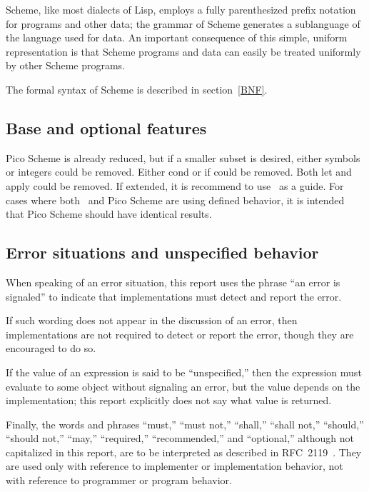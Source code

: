 Scheme, like most dialects of Lisp, employs a fully parenthesized prefix
notation for programs and other data; the grammar of Scheme generates a
sublanguage of the language used for data.  An important
consequence of this simple, uniform representation is that
Scheme programs and data can easily be treated uniformly by other Scheme programs.

The formal syntax of Scheme is described in section~\ref{BNF}.

\subsection{Base and optional features}
\label{qualifiers}

Pico Scheme is already reduced, but if a smaller subset is desired,
either symbols or integers could be removed. Either {\cf cond} or {\cf
  if} could be removed. Both {\cf let} and {\cf apply} could be
removed. If extended, it is recommend to use \rsevenrs\ as a
guide. For cases where both \rsevenrs\ and Pico Scheme are using
defined behavior, it is intended that Pico Scheme should have
identical results.


\subsection{Error situations and unspecified behavior}
\label{errorsituations}

When speaking of an error situation, this report uses the phrase ``an
error is signaled'' to indicate that implementations must detect and
report the error.

\vest If such wording does not appear in the discussion of
an error, then implementations are not required to detect or report the
error, though they are encouraged to do so.

\vest If the value of an expression is said to be ``unspecified,'' then
the expression must evaluate to some object without signaling an error,
but the value depends on the implementation; this report explicitly does
not say what value is returned. 

\vest Finally, the words and phrases ``must,'' ``must not,'' ``shall,''
``shall not,'' ``should,'' ``should not,'' ``may,'' ``required,''
``recommended,'' and ``optional,'' although not capitalized in this
report, are to be interpreted as described in RFC~2119~\cite{rfc2119}.
They are used only with reference to implementer or implementation behavior,
not with reference to programmer or program behavior.

